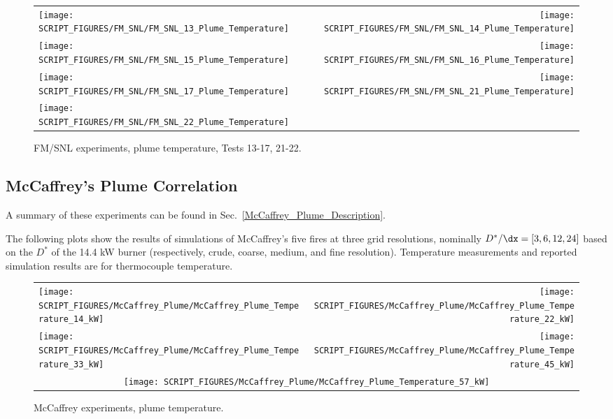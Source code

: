 \begin{figure}[p]
\begin{tabular*}{\textwidth}{l@{\extracolsep{\fill}}r}
\texttt{[image: SCRIPT\_FIGURES/FM\_SNL/FM\_SNL\_13\_Plume\_Temperature]} &
\texttt{[image: SCRIPT\_FIGURES/FM\_SNL/FM\_SNL\_14\_Plume\_Temperature]} \\
\texttt{[image: SCRIPT\_FIGURES/FM\_SNL/FM\_SNL\_15\_Plume\_Temperature]} &
\texttt{[image: SCRIPT\_FIGURES/FM\_SNL/FM\_SNL\_16\_Plume\_Temperature]} \\
\texttt{[image: SCRIPT\_FIGURES/FM\_SNL/FM\_SNL\_17\_Plume\_Temperature]} &
\texttt{[image: SCRIPT\_FIGURES/FM\_SNL/FM\_SNL\_21\_Plume\_Temperature]} \\
\texttt{[image: SCRIPT\_FIGURES/FM\_SNL/FM\_SNL\_22\_Plume\_Temperature]} &
\end{tabular*}
\caption[FM/SNL experiments, plume temperature, Tests 13-17, 21-22]
{FM/SNL experiments, plume temperature, Tests 13-17, 21-22.}
\label{FM_SNL_Plume_3}
\end{figure}

\clearpage



\subsection{McCaffrey's Plume Correlation}
\label{McCaffrey_Plume_Temperature}

A summary of these experiments can be found in Sec.~\ref{McCaffrey_Plume_Description}.

The following plots show the results of simulations of McCaffrey's five fires at three grid resolutions, nominally $D^*/\dx=[3,6,12,24]$ based on the $D^*$ of the 14.4 kW burner (respectively, crude, coarse, medium, and fine resolution).  Temperature measurements and reported simulation results are for thermocouple temperature.

\begin{figure}[h!]
\begin{tabular*}{\textwidth}{l@{\extracolsep{\fill}}r}
\texttt{[image: SCRIPT\_FIGURES/McCaffrey\_Plume/McCaffrey\_Plume\_Temperature\_14\_kW]} &
\texttt{[image: SCRIPT\_FIGURES/McCaffrey\_Plume/McCaffrey\_Plume\_Temperature\_22\_kW]} \\
\texttt{[image: SCRIPT\_FIGURES/McCaffrey\_Plume/McCaffrey\_Plume\_Temperature\_33\_kW]} &
\texttt{[image: SCRIPT\_FIGURES/McCaffrey\_Plume/McCaffrey\_Plume\_Temperature\_45\_kW]} \\
\multicolumn{2}{c}{\texttt{[image: SCRIPT\_FIGURES/McCaffrey\_Plume/McCaffrey\_Plume\_Temperature\_57\_kW]}}
\end{tabular*}
\caption[McCaffrey experiments, plume temperature]
{McCaffrey experiments, plume temperature.}
\label{McCaffrey_Plume_Temperature_Plots}
\end{figure}

